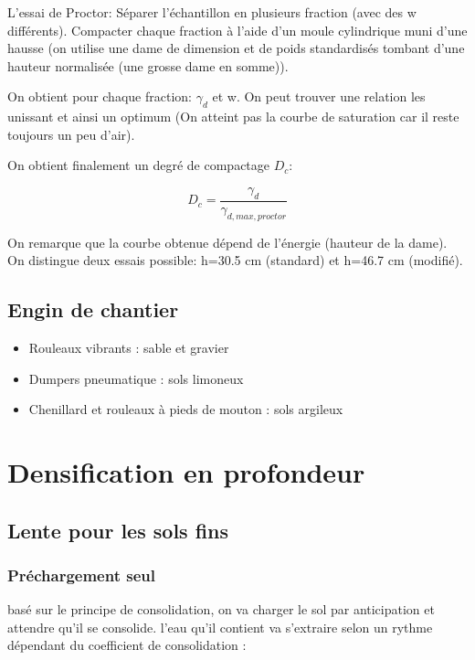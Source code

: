 \medskip

L'essai de Proctor: Séparer l'échantillon en plusieurs fraction (avec des w différents). Compacter chaque fraction à l'aide d'un moule cylindrique muni d'une hausse (on utilise une dame de dimension et de poids standardisés tombant d'une hauteur normalisée (une grosse dame en somme)).

On obtient pour chaque fraction: $\gamma_d$ et w. On peut trouver une relation les unissant et ainsi un optimum (On atteint pas la courbe de saturation car il reste toujours un peu d'air).

On obtient finalement un degré de compactage $D_c$:

$$ D_c = \frac{\gamma_d}{\gamma_{d,max,proctor}} $$

On remarque que la courbe obtenue dépend de l'énergie (hauteur de la dame). On distingue deux essais possible: h=30.5 cm (standard) et h=46.7 cm (modifié).

\subsection{Engin de chantier}

\begin{itemize}
    \item Rouleaux vibrants : sable et gravier
    \item Dumpers pneumatique : sols limoneux
    \item Chenillard et rouleaux à pieds de mouton : sols argileux
\end{itemize}

\section{Densification en profondeur}

\subsection{Lente pour les sols fins}

\subsubsection{Préchargement seul}

basé sur le principe de consolidation, on va charger le sol par anticipation et attendre qu'il se consolide. l'eau qu'il contient va s'extraire selon un rythme dépendant du coefficient de consolidation :

